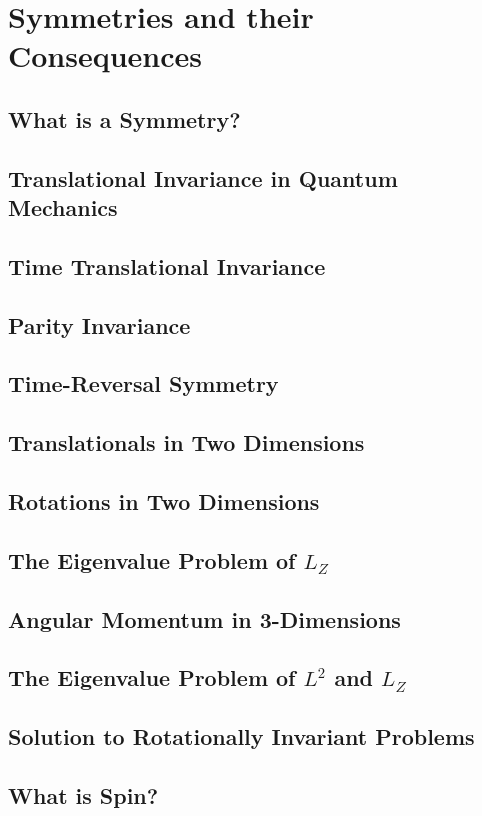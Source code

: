 \chapter{Symmetries and their Consequences}
\section{What is a Symmetry?}
\section{Translational Invariance in Quantum Mechanics}
\section{Time Translational Invariance}
\section{Parity Invariance}
\section{Time-Reversal Symmetry}
\section{Translationals in Two Dimensions}
\section{Rotations in Two Dimensions}
\section{The Eigenvalue Problem of $L_{Z}$}
\section{Angular Momentum in 3-Dimensions}
\section{The Eigenvalue Problem of $L^{2}$ and $L_{Z}$}
\section{Solution to Rotationally Invariant Problems}
\newpage
\section{What is Spin?}
